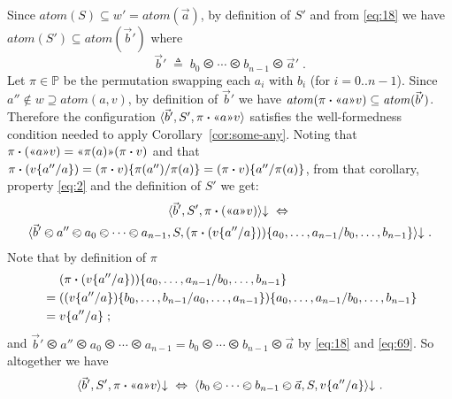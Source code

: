 \documentclass{LMCS}
\theoremstyle{plain}
\theoremstyle{definition}
\newcommand{\act}{\mathbin{\mbox{\boldmath$\cdot$}}}
\newcommand{\atm}[1][a]{#1}
\newcommand{\atoms}{\mathit{atom}}
\newcommand{\bimp}{\Leftrightarrow}
\newcommand{\BINDVAL}[2]{\mathopen{\text{\normalfont\guillemotleft}}#1
  \mathclose{\text{\normalfont\guillemotright}}#2}
\newcommand{\config}[3]{\langle#1, #2, #3\rangle}
\newcommand{\defeq}{\triangleq}
\newcommand{\LP}{\mathopen{\kw{(}}}
\newcommand{\kw}[1]{\mathsf{#1}}
\newcommand{\ords}{\olessthan}\newcommand{\PAIR}[2]{\LP#1\mathbin{\kw{,}}#2\RP}
\newcommand{\Perm}{\mathbb{P}}
\newcommand{\rename}[2]{\{#2/#1\}}
\newcommand{\RP}{\mathclose{\kw{)}}}
\newcommand{\s}[1][a]{\vec{#1}}
\newcommand{\stk}[1][S]{#1}
\newcommand{\terminates}[1][]{{\downarrow_{#1}}}
\newcommand{\val}[1][v]{#1}
\newcommand{\w}[1][w]{#1}
\begin{document}
  Since $\atoms(\stk)\subseteq\w'=\atoms(\s)$, by definition of
  $\stk'$ and from \eqref{eq:18} we have
  $\atoms(\stk')\subseteq\atoms(\s[b]')$ where
  \begin{equation}
    \label{eq:69}
    \s[b]' \;\defeq\; \atm[b]_0\ords\cdots\ords\atm[b]_{n-1}\ords\s'\;.
  \end{equation}
  Let $\pi\in\Perm$ be the permutation swapping each $\atm_i$ with
  $\atm[b]_i$ (for $i=0..n-1$). Since
  $\atm''\notin\w\supseteq\atoms(\atm,\val)$, by definition of
  $\s[b]'$ we have
  $\atoms(\pi\act\BINDVAL{\atm}{\val})\subseteq\atoms(\s[b]')$.
  Therefore the configuration
  $\config{\s[b]'}{\stk'}{\pi\act\BINDVAL{\atm}{\val}}$ satisfies the
  well-formedness condition needed to apply
  Corollary~\ref{cor:some-any}. Noting that $\pi\act
  (\BINDVAL{\atm}{\val}) = \BINDVAL{\pi(\atm)}{(\pi\act\val)}$ and
  that $\pi\act(\val\rename{\atm}{\atm''}) =
  (\pi\act\val)\rename{\pi(\atm)}{\pi(\atm'')} = (\pi\act
  \val)\rename{\pi(\atm)}{\atm''}$, from that corollary, property
  \eqref{eq:2} and the definition of $\stk'$ we get:
  \begin{multline*}
  \config{\s[b]'}{\stk'}{\pi\act(\BINDVAL{\atm}{\val})}\terminates
    \;\bimp\;\\
    \config{\s[b]'\ords\atm''\ords\atm_0\ords\cdots\ords\atm_{n-1}}{\stk}
    {(\pi\act(\val\rename{\atm}{\atm''}))
      \rename{\atm[b]_0,\ldots,\atm[b]_{n-1}}
      {\atm_0,\ldots,\atm_{n-1}}}\terminates\;.
  \end{multline*}
  Note that by definition of $\pi$
  \begin{align*}
          &(\pi\act(\val\rename{\atm}{\atm''}))
          \rename{\atm[b]_0,\ldots,\atm[b]_{n-1}}
          {\atm_0,\ldots,\atm_{n-1}}\\
    {}={} &((\val\rename{\atm}{\atm''})
    \rename{\atm_0,\ldots,\atm_{n-1}}
    {\atm[b]_0,\ldots,\atm[b]_{n-1}})
    \rename{\atm[b]_0,\ldots,\atm[b]_{n-1}}
    {\atm_0,\ldots,\atm_{n-1}}\\
    {}={} &\val\rename{\atm}{\atm''}\;;
  \end{align*}
  and $\s[b]'\ords \atm''\ords \atm_0\ords\cdots\ords \atm_{n-1} =
  \atm[b]_0\ords\cdots\ords\atm[b]_{n-1}\ords\s$ by \eqref{eq:18} and
  \eqref{eq:69}. So altogether we have
  \begin{equation}
    \label{eq:23}
    \config{\s[b]'}{\stk'}{\pi\act\BINDVAL{\atm}{\val}}\terminates
    \;\bimp\;
    \config{\atm[b]_0\ords\cdots\ords\atm[b]_{n-1}\ords\s}{\stk}{\val\rename{\atm}{\atm''}}\terminates\;.  
  \end{equation}
\end{document}
